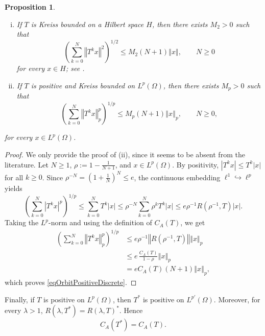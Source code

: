 \documentclass[12pt]{amsart}
\theoremstyle{plain}
\newtheorem{prop}[thm]{Proposition}
\theoremstyle{remark}
\theoremstyle{definition}
\newcommand{\norm}[1]{\left\Vert #1\right\Vert}
\begin{document}
	\begin{prop}\label{propOrbitDiscrete}
		\begin{enumerate}[(i)]
			\item
			If $T$ is Kreiss bounded on a Hilbert space $H$, then there
			exists $M_2>0$ such that
			\begin{equation*}\label{eqOrbitDiscreteH}
				\left(\sum_{k=0}^{N}\norm{T^kx}^2\right)^{1/2}
				\le
				M_2(N+1)\norm{x}, 
				\qquad N\ge0
			\end{equation*}
			for every $x\in H$; see \cite{CohenCunyEisnerLin2020}.
			
			\item
			If $T$ is positive and Kreiss bounded on $L^p(\Omega)$, then there exists $M_p >0$ such that
			\begin{equation}\label{eqOrbitPositiveDiscrete}
				\left(
				\sum_{k=0}^{N}\norm{T^kx}_p^p
				\right)^{1/p}
				\le
				M_p(N+1)\norm{x}_p,
				\qquad N\ge0,
			\end{equation}
		\end{enumerate}
		for every $x\in L^p(\Omega)$.
	\end{prop}
	
	\begin{proof}
		We only provide the proof of (ii), since it seems to be absent from the literature. Let $N\ge1$, $\rho:=1-\frac1{N+1}$, and $x\in L^p(\Omega)$. By positivity, $|T^kx|\le T^k|x|$ for all $k\ge0$. Since $\rho^{-N}=\left(1+\frac1N\right)^N\le e$, the continuous embedding $\ell^1 \hookrightarrow \ell^p$ yields
		\[
		\left(\sum_{k=0}^{N}|T^kx|^p\right)^{1/p}
		\le
		\sum_{k=0}^{N}T^k|x|
		\le
		\rho^{-N}\sum_{k=0}^{N}\rho^kT^k|x|
		\le
		e\rho^{-1}R(\rho^{-1},T)|x|.
		\]
		Taking the $L^p$-norm and using the definition of $C_A(T)$, we get
		\begin{align*}
			\left(\sum_{k=0}^{N}\norm{T^kx}_p^p\right)^{1/p}
			&\le
			e\rho^{-1}\norm{R(\rho^{-1},T)}\norm{x}_p\\
			&\le
			e\,\frac{C_A(T)}{1-\rho}\norm{x}_p\\
			&=
			eC_A(T)(N+1)\norm{x}_p,
		\end{align*}
		which proves \eqref{eqOrbitPositiveDiscrete}.
	\end{proof}
	
	Finally, if $T$ is positive on $L^p(\Omega)$, then $T^*$ is positive on
	$L^{p'}(\Omega)$. Moreover, for every $\lambda>1$, $
	R(\lambda,T^*)=R(\lambda,T)^*.$ Hence
	\begin{equation}\label{eqAdjointAbelDiscrete}
		C_A(T^*)=C_A(T).
	\end{equation}
\end{document}
